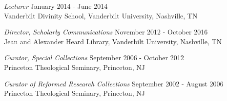 \documentclass[]{res} %
\newif\ifbullets
\begin{document}
\begin{resume}
\ifbullets
\begin{itemize}
    \item Promoted new models of scholarly communications and digital scholarship
    \item Supported learning across campus through the library’s teaching program
    \item Supervised the three distinctive collections units in the library system: Special Collections and University Archives, Eskind Biomedical Special Collections, and the Vanderbilt University Television News Archive
\end{itemize}
\fi

{\sl Lecturer} \hfill January 2014 - June 2014 \\
Vanderbilt Divinity School, Vanderbilt University, Nashville, TN 

{\sl Director, Scholarly Communications} \hfill November 2012 - October 2016 \\
Jean and Alexander Heard Library, Vanderbilt University, Nashville, TN

\ifbullets
\begin{itemize}
    \item Appointed first director to build new department
    \item Advanced library support for digital scholarship in the humanities, social sciences, and natural sciences
    \item Provided copyright guidance to librarians, faculty, students, and staff
    \item Supervised four direct and three indirect reports
\end{itemize}
\fi

{\sl Curator, Special Collections} \hfill September 2006 - October 2012 \\
Princeton Theological Seminary, Princeton, NJ 

\ifbullets
\begin{itemize}
    \item Supervised six staff members
    \item Edited the \emph{Luce Library Bulletin}
    \item Served as the product owner for the digital collections team
    \item Launched the \emph{Theological Commons}, largest open access library of religious and theological literature
\end{itemize}
\fi 

{\sl Curator of Reformed Research Collections} \hfill September 2002 - August 2006 \\
Princeton Theological Seminary, Princeton, NJ 


\end{resume}
\end{document}
